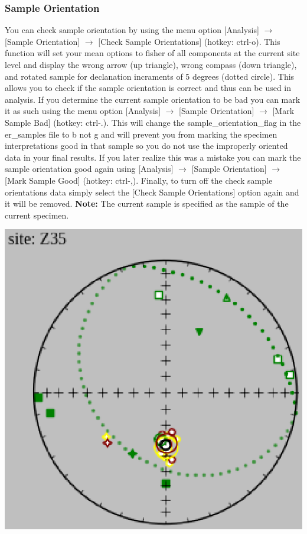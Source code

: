 \documentclass[11pt]{book}
\begin{document}
{\subsubsection{Sample Orientation}\label{sample-orient}

You can check sample orientation by using the menu option [Analysis] $\rightarrow$ [Sample Orientation] $\rightarrow$ [Check Sample Orientations] (hotkey: ctrl-o). This function will set your mean options to fisher of all components at the current site level and display the wrong arrow (up triangle), wrong compass (down triangle), and rotated sample for declanation incraments of 5 degrees (dotted circle). This allows you to check if the sample orientation is correct and thus can be used in analysis. If you determine the current sample orientation to be bad you can mark it as such using the menu option [Analysis] $\rightarrow$ [Sample Orientation] $\rightarrow$ [Mark Sample Bad] (hotkey: ctrl-.). This will change the sample_orientation_flag in the er_samples file to b not g and will prevent you from marking the specimen interpretations good in that sample so you do not use the improperly oriented data in your final results. If you later realize this was a mistake you can mark the sample orientation good again using [Analysis] $\rightarrow$ [Sample Orientation] $\rightarrow$ [Mark Sample Good] (hotkey: ctrl-,). Finally, to turn off the check sample orientations data simply select the [Check Sample Orientations] option again and it will be removed. \textbf{Note:} The current sample is specified as the sample of the current specimen.

\includegraphics[width=10 cm]{EPSFiles/demag_gui_CheckSampleOrient.eps}

}
\end{document}
